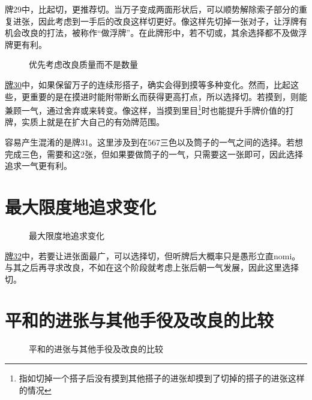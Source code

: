 牌29中，比起切，更推荐切。当万子变成两面形状后，可以顺势解除索子部分的重复进张，因此考虑到一手后的改良这样切更好。像这样先切掉一张对子，让浮牌有机会改良的打法，被称作“做浮牌”。在此牌形中，若不切或，其余选择都不及做浮牌更有利。

\begin{figure}[h]
    \caption{优先考虑改良质量而不是数量}
    \label{lec6:pai30-31}
    \par\bigskip
\end{figure}
\hyperlink{lec6:pai30-31}{牌30}中，如果保留万子的连续形搭子，确实会得到摸等多种变化。然而，比起这些，更重要的是在摸进时能附带断幺而获得更高打点，所以选择切。若摸到，则能兼顾一气，通过舍弃或来转变。像这样，当摸到里目\footnote{指如切掉一个搭子后没有摸到其他搭子的进张却摸到了切掉的搭子的进张这样的情况}时也能提升手牌价值的打牌，实质上就是在扩大自己的有効牌范围。

容易产生混淆的是牌31。这里涉及到在567三色以及筒子的一气之间的选择。若想完成三色，需要和这2张，但如果要做筒子的一气，只需要这一张即可，因此选择追求一气更有利。

\section{最大限度地追求变化}
\begin{figure}[h]
    \caption{最大限度地追求变化}
    \label{lec6:pai32}
\end{figure}
\hyperlink{lec6:pai32}{牌32}中，若要让进张面最广，可以选择切，但听牌后大概率只是愚形立直nomi。与其之后再寻求改良，不如在这个阶段就考虑上张后朝一气发展，因此这里选择切。

\section{平和的进张与其他手役及改良的比较}
\begin{figure}[h]
    \caption{平和的进张与其他手役及改良的比较}
    \label{lec6:pai33-37}
    \par\bigskip
    \par\bigskip
    \par\bigskip
    \par\bigskip
\end{figure}

